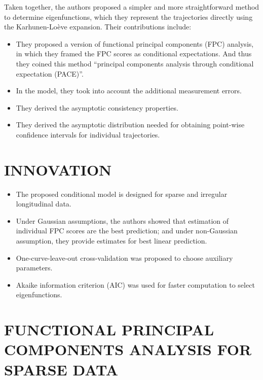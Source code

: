 \documentclass[11pt]{report}
\begin{document}
Taken together, the authors proposed a simpler and more straightforward method to determine eigenfunctions, which they represent the trajectories directly using the Karhunen-Lo\`{e}ve expansion.
Their contributions include:
\begin{itemize}
	\item They proposed a version of functional principal components (FPC) analysis, in which they framed the FPC scores as conditional expectations.
	And thus they coined this method ``principal components analysis through conditional expectation (PACE)''.
	\item In the model, they took into account the additional measurement errors. 
	\item They derived the asymptotic consistency properties.
	\item They derived the asymptotic distribution needed for obtaining point-wise confidence intervals for individual trajectories. 
\end{itemize}

\section{INNOVATION} 
\begin{itemize}
	\item The proposed conditional model is designed for sparse and irregular longitudinal data. 
	\item Under Gaussian assumptions, the authors showed that estimation of individual FPC scores are the best prediction; and under non-Gaussian assumption, they provide estimates for best linear prediction. 
	\item One-curve-leave-out cross-validation was proposed to choose auxiliary parameters. 
	\item Akaike information criterion (AIC) was used for faster computation to select eigenfunctions. 
\end{itemize}

\section{FUNCTIONAL PRINCIPAL COMPONENTS ANALYSIS FOR SPARSE DATA}
\end{document}
